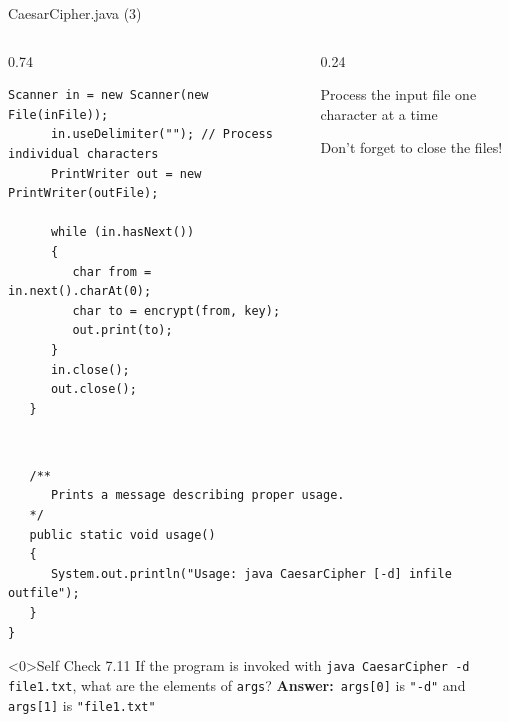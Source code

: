 \documentclass[aspectratio=43,10pt,t]{beamer}
\newcommand{\hiddenslides}{0}
\newcommand{\code}[1]{\texttt{#1}}
\newcommand{\callout}[2][\linewidth]{%
  {\setlength{\fboxsep}{3pt}\colorbox{callout}{%
    \parbox{\dimexpr#1-6pt\relax}{\raggedright\footnotesize #2}}}}
\newcommand{\answer}{\textbf{Answer:}\ }
\begin{document}
\begin{frame}[fragile]{CaesarCipher.java (3)}
  \begin{columns}[T]
    \begin{column}{0.74\textwidth}
\begin{lstlisting}[style=program,firstnumber=41,basicstyle=\ttfamily\fontsize{5.9}{7}\selectfont]
      Scanner in = new Scanner(new File(inFile));
      in.useDelimiter(""); // Process individual characters
      PrintWriter out = new PrintWriter(outFile);

      while (in.hasNext())
      {
         char from = in.next().charAt(0);
         char to = encrypt(from, key);
         out.print(to);
      }
      in.close();
      out.close();
   }
\end{lstlisting}
    \end{column}
    \begin{column}{0.24\textwidth}
      \vskip8mm
      \callout{Process the input file one character at a time}
      \vskip10mm
      \callout{Don't forget to close the files!}
    \end{column}
  \end{columns}
  \vskip2mm
\begin{lstlisting}[style=program,firstnumber=74]

   /**
      Prints a message describing proper usage.
   */
   public static void usage()
   {
      System.out.println("Usage: java CaesarCipher [-d] infile outfile");
   }
}
\end{lstlisting}
\end{frame}

\begin{frame}<\hiddenslides>{Self Check 7.11}
  If the program is invoked with \code{java CaesarCipher -d file1.txt}, what are the
  elements of \code{args}?
  \vskip4mm
  \answer\code{args[0]} is \code{"-d"} and \code{args[1]} is \code{"file1.txt"}
\end{frame}
\end{document}

